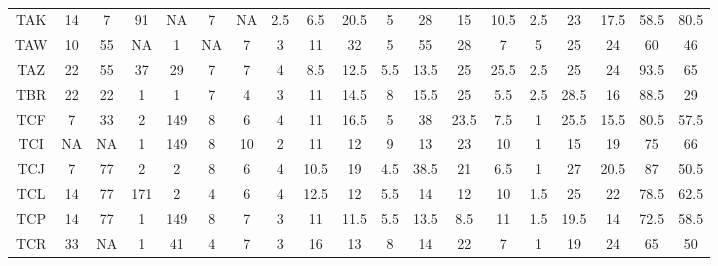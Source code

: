 \begin{table}[htp]
\begin{center}
\begin{sideways}
{\begin{tabulary}{1.5\textwidth}{|c|c|c|c|c|c|c|c|c|c|c|c|c|c|c|c|c|c|c|}
TAK & 14 & 7 & 91 & NA & 7 & NA & 2.5 & 6.5 & 20.5 & 5 & 28 & 15 & 10.5 & 2.5 & 23 & 17.5 & 58.5 & 80.5 \\
TAW & 10 & 55 & NA & 1 & NA & 7 & 3 & 11 & 32 & 5 & 55 & 28 & 7 & 5 & 25 & 24 & 60 & 46 \\
TAZ & 22 & 55 & 37 & 29 & 7 & 7 & 4 & 8.5 & 12.5 & 5.5 & 13.5 & 25 & 25.5 & 2.5 & 25 & 24 & 93.5 & 65 \\
TBR & 22 & 22 & 1 & 1 & 7 & 4 & 3 & 11 & 14.5 & 8 & 15.5 & 25 & 5.5 & 2.5 & 28.5 & 16 & 88.5 & 29 \\
TCF & 7 & 33 & 2 & 149 & 8 & 6 & 4 & 11 & 16.5 & 5 & 38 & 23.5 & 7.5 & 1 & 25.5 & 15.5 & 80.5 & 57.5 \\
TCI & NA & NA & 1 & 149 & 8 & 10 & 2 & 11 & 12 & 9 & 13 & 23 & 10 & 1 & 15 & 19 & 75 & 66 \\
TCJ & 7 & 77 & 2 & 2 & 8 & 6 & 4 & 10.5 & 19 & 4.5 & 38.5 & 21 & 6.5 & 1 & 27 & 20.5 & 87 & 50.5 \\
TCL & 14 & 77 & 171 & 2 & 4 & 6 & 4 & 12.5 & 12 & 5.5 & 14 & 12 & 10 & 1.5 & 25 & 22 & 78.5 & 62.5 \\
TCP & 14 & 77 & 1 & 149 & 8 & 7 & 3 & 11 & 11.5 & 5.5 & 13.5 & 8.5 & 11 & 1.5 & 19.5 & 14 & 72.5 & 58.5 \\
TCR & 33 & NA & 1 & 41 & 4 & 7 & 3 & 16 & 13 & 8 & 14 & 22 & 7 & 1 & 19 & 24 & 65 & 50 \bigstrut[b] \\
\hline
\end{tabulary}
}
\end{sideways}
\end{center}
\caption[*** ADDS ***]{}
\label{appendixc/table6}
\end{table}